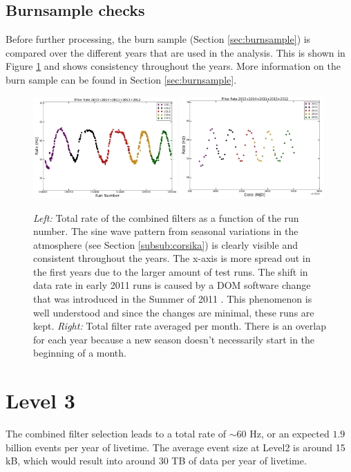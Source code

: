 \subsection{Burnsample checks}
Before further processing, the burn sample (Section \ref{sec:burnsample}) is compared over the different years that are used in the analysis. This is shown in Figure \ref{fig:burnsamplechecks} and shows consistency throughout the years. More information on the burn sample can be found in Section \ref{sec:burnsample}.

\begin{figure}[t]
\centering
\includegraphics[width=0.49\textwidth]{chapter8/img/FilterRatePerRun.png}
\includegraphics[width=0.49\textwidth]{chapter8/img/FilterRatePerMonth.png}
\caption{\textit{Left: }Total rate of the combined filters as a function of the run number. The sine wave pattern from seasonal variations in the atmosphere (see Section \ref{subsub:corsika}) is clearly visible and consistent throughout the years. The x-axis is more spread out in the first years due to the larger amount of test runs. The shift in data rate in early 2011 runs is caused by a DOM software change that was introduced in the Summer of 2011 \cite{2011rate}. This phenomenon is well understood and since the changes are minimal, these runs are kept. \textit{Right: }Total filter rate averaged per month. There is an overlap for each year because a new season doesn't necessarily start in the beginning of a month.}
\label{fig:burnsamplechecks}
\end{figure}

\section{Level 3}
The combined filter selection leads to a total rate of $\sim60$ Hz, or an expected $1.9$ billion events per year of livetime. The average event size at Level2 is around 15 kB, which would result into around 30 TB of data per year of livetime.

